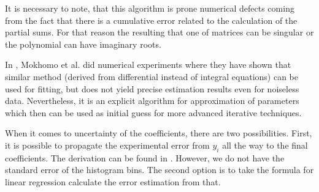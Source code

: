 It is necessary to note, that this algorithm is prone numerical defects coming from the fact that there is a cumulative error related to the calculation of the partial sums. For that reason the resulting that one of matrices can be singular or the polynomial can have imaginary roots.

In \cite{mokhomo2021}, Mokhomo et al. did numerical experiments where they have shown that similar method (derived from differential instead of integral equations) can be used for fitting, but does not yield precise estimation results even for noiseless data. Nevertheless, it is an explicit algorithm for approximation of parameters which then can be used as initial guess for more advanced iterative techniques.

When it comes to uncertainty of the coefficients, there are two possibilities. First, it is possible to propagate the experimental error from $y_i$ all the way to the final coefficients. The derivation can be found in \cite{lecca2021}. However, we do not have the standard error of the histogram bins. The second option is to take the formula for linear regression calculate the error estimation from that.

